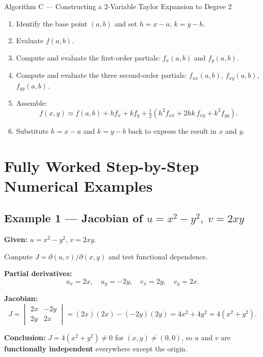 \documentclass[12pt,a4paper]{article}
\begin{document}
\begin{infobox}{Algorithm C --- Constructing a 2-Variable Taylor Expansion to Degree 2}
\begin{enumerate}[leftmargin=*, label=\textbf{Step \arabic*.}]
  \item Identify the base point \( (a,b) \) and set \( h = x - a \), \( k = y - b \).
  \item Evaluate \( f(a,b) \).
  \item Compute and evaluate the first-order partials: \( f_x(a,b) \) and \( f_y(a,b) \).
  \item Compute and evaluate the three second-order partials: \( f_{xx}(a,b) \), \( f_{xy}(a,b) \), \( f_{yy}(a,b) \).
  \item Assemble:
    \[
      f(x,y) \approx f(a,b) + hf_x + kf_y + \tfrac{1}{2}(h^2 f_{xx} + 2hk\,f_{xy} + k^2 f_{yy}).
    \]
  \item Substitute \( h = x-a \) and \( k = y-b \) back to express the result in \( x \) and \( y \).
\end{enumerate}
\end{infobox}

\section{Fully Worked Step-by-Step Numerical Examples}

\subsection*{Example 1 --- Jacobian of \( u = x^{2}-y^{2},\; v = 2xy \)}

\textbf{Given:} \( u = x^{2} - y^{2} \), \( v = 2xy \).

Compute \( J = \partial(u,v)/\partial(x,y) \) and test functional dependence.

\textbf{Partial derivatives:}
\[
  u_x = 2x,\quad u_y = -2y,\quad v_x = 2y,\quad v_y = 2x.
\]

\textbf{Jacobian:}
\[
  J = \begin{vmatrix} 2x & -2y \\ 2y & 2x \end{vmatrix}
    = (2x)(2x) - (-2y)(2y)
    = 4x^{2} + 4y^{2}
    = 4(x^{2}+y^{2}).
\]

\textbf{Conclusion:} \( J = 4(x^{2}+y^{2}) \neq 0 \) for \( (x,y) \neq (0,0) \), so \( u \) and \( v \) are \textbf{functionally independent} everywhere except the origin.
\end{document}
